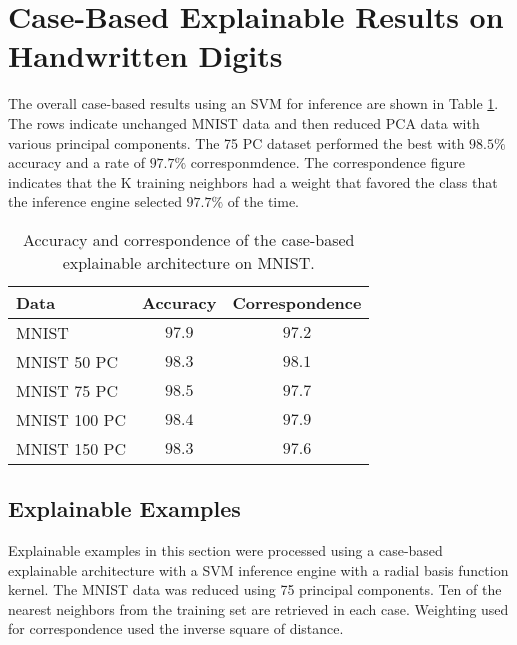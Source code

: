 \section{Case-Based Explainable Results on Handwritten Digits}
\label{sec:case_based_handwriting_results}

The overall case-based results using an SVM for inference are shown in Table
\ref{tab:mnist_case_based_results}. The rows indicate unchanged MNIST data and
then reduced PCA data with various principal components. The 75 PC dataset
performed the best with $98.5\%$ accuracy and a rate of $97.7\%$
corresponmdence. The correspondence figure indicates that the K training
neighbors had a weight that favored the class that the inference engine selected
$97.7\%$ of the time.


\begin{table}[H]
    \renewcommand{\arraystretch}{1.3}
    \centering
    \caption{Accuracy and correspondence of the case-based explainable architecture on MNIST.}
    \begin{tabular}{|l|c|c|}
        \hline
        Data & Accuracy & Correspondence \\
        \hline
        \hline
        MNIST & $97.9$ & $97.2$ \\
        \hline
        MNIST 50 PC & $98.3$ & $98.1$ \\
        \hline
        MNIST 75 PC & $98.5$ & $97.7$  \\
        \hline
        MNIST 100 PC & $98.4$ & $97.9$  \\
        \hline
        MNIST 150 PC & $98.3$ & $97.6$  \\
        \hline
    \end{tabular}
    \label{tab:mnist_case_based_results}
\end{table}

\subsection{Explainable Examples}
\label{sec:case_based_explainable_examples}

Explainable examples in this section were processed using a case-based
explainable architecture with a SVM inference engine with a radial basis function
kernel.  The MNIST data was reduced using 75 principal components.  Ten of the
nearest neighbors from the training set are retrieved in each case. Weighting
used for correspondence used the inverse square of distance.


